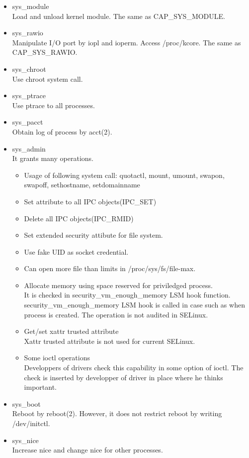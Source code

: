 \documentclass{article}
\begin{document}
\begin{itemize}
  \item sys\_module\\	  
	  Load and unload kernel module. The same as CAP\_SYS\_MODULE.
  \item sys\_rawio\\
	  Manipulate I/O port by iopl and ioperm. Access /proc/kcore.
	  The same as CAP\_SYS\_RAWIO.
  \item         sys\_chroot\\
	  Use chroot system call.
  \item         sys\_ptrace\\
	  Use ptrace to all processes.
  \item         sys\_pacct\\
	  Obtain log of process by acct(2).
  \item  sys\_admin\\
	  It grants many operations. 
	  \begin{itemize}
	   \item Usage of following system call: quotactl, mount,
		 umount, swapon, swapoff, sethostname, setdomainname
	   \item Set attribute to all IPC objects(IPC\_SET) 
	   \item Delete all IPC objects(IPC\_RMID)
	   \item Set extended security attibute for file system.
	   \item Use fake UID as socket credential.
	   \item Can open more file than limits in
		 /proc/sys/fs/file-max.
	   \item Allocate memory using space reserved for priviledged process.\\
		 It is checked in security\_vm\_enough\_memory LSM hook
		 function. security\_vm\_enough\_memory LSM hook is
		 called in case such as when process is created. The
		 operation is not audited in SELinux.
	   \item Get/set xattr trusted attribute\\
		  Xattr trusted attribute is not used for current SELinux.
	   \item Some ioctl operations\\
		 Developpers of drivers check this capability in some
		 option of ioctl. The check is inserted by developper of
		 driver in place where he thinks important.
	  \end{itemize}
  \item sys\_boot\\
	  Reboot by reboot(2). However, it does not restrict
	  reboot by writing /dev/initctl.
  \item sys\_nice\\
	  Increase nice and change nice for other processes.
	  

\end{itemize}
\end{document}

